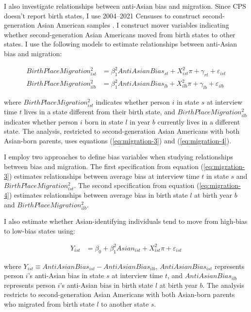 I also investigate relationships between anti-Asian bias and migration. Since CPS doesn't report birth states, I use 2004--2021 Censuses to construct second-generation Asian American samples \autocite{floodsarahIntegratedPublicUse2021}. I construct mover variables indicating whether second-generation Asian Americans moved from birth states to other states. I use the following models to estimate relationships between anti-Asian bias and migration:

\begin{align}
BirthPlaceMigration_{ist}^2 &= \beta_1^2 AntiAsianBias_{st} 
                   + X_{ist}^2\pi + \gamma_{rt} 
                   + \varepsilon_{ist} \label{eq:migration-3} \\
BirthPlaceMigration_{ilb}^2 &= \beta_1^2 AntiAsianBias_{lb} 
                   + X_{ilb}^2\pi + \gamma_{lb} 
                   + \varepsilon_{ilb} \label{eq:migration-4}
\end{align}

where $BirthPlaceMigration_{ist}^2$ indicates whether person $i$ in state $s$ at interview time $t$ lives in a state different from their birth state, and $BirthPlaceMigration_{ilb}^2$ indicates whether person $i$ born in state $l$ in year $b$ currently lives in a different state. The analysis, restricted to second-generation Asian Americans with both Asian-born parents, uses equations (\ref{eq:migration-3}) and (\ref{eq:migration-4}).

I employ two approaches to define bias variables when studying relationships between bias and migration. The first specification from equation (\ref{eq:migration-3}) estimates relationships between average bias at interview time $t$ in state $s$ and $BirthPlaceMigration_{ist}^2$. The second specification from equation (\ref{eq:migration-4}) estimates relationships between average bias in birth state $l$ at birth year $b$ and $BirthPlaceMigration_{ilb}^2$.

I also estimate whether Asian-identifying individuals tend to move from high-bias to low-bias states using:

\begin{align}
Y_{ist} &= \beta_0 + \beta_1^2 Asian_{ist} +
                   X_{ist}^2\pi
                   + \varepsilon_{ist} \label{eq:migration-5}
\end{align}

where $Y_{ist} \equiv AntiAsianBias_{ist} - AntiAsianBias_{ilb}$, $AntiAsianBias_{ist}$ represents person $i$'s anti-Asian bias in state $s$ at interview time $t$, and $AntiAsianBias_{ilb}$ represents person $i$'s anti-Asian bias in birth state $l$ at birth year $b$. The analysis restricts to second-generation Asian Americans with both Asian-born parents who migrated from birth state $l$ to another state $s$.

